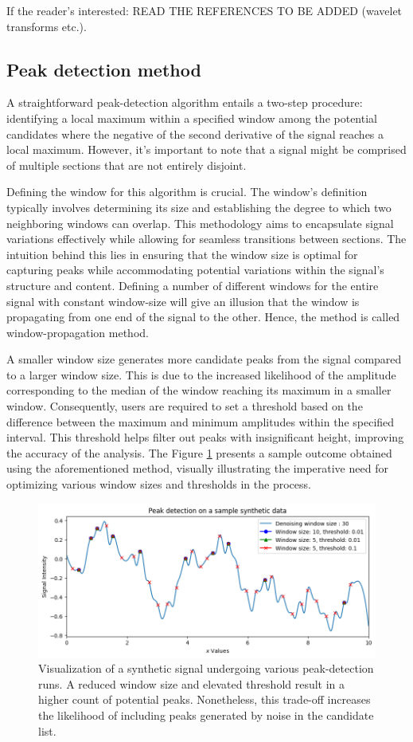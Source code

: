 \documentclass{article}
\begin{document}
If the reader's interested: READ THE REFERENCES TO BE ADDED (wavelet transforms etc.).
%
%
\subsection{Peak detection method}
A straightforward peak-detection algorithm entails a two-step procedure: 
identifying a local maximum within a specified window among the potential candidates where the negative of the second derivative of the signal reaches a local maximum.
However, it's important to note that a signal might be comprised of multiple sections that are not entirely disjoint.

Defining the window for this algorithm is crucial.
The window's definition typically involves determining its size and establishing the degree to which two neighboring windows can overlap. 
This methodology aims to encapsulate signal variations effectively while allowing for seamless transitions between sections.
The intuition behind this lies in ensuring that the window size is optimal for capturing peaks while accommodating potential variations within the signal's structure and content.
Defining a number of different windows for the entire signal with constant window-size will give an illusion that the window is propagating from one end of the signal to the other.
Hence, the method is called window-propagation method. 

A smaller window size generates more candidate peaks from the signal compared to a larger window size.
This is due to the increased likelihood of the amplitude corresponding to the median of the window reaching its maximum in a smaller window. 
Consequently, users are required to set a threshold based on the difference between the maximum and minimum amplitudes within the specified interval.
This threshold helps filter out peaks with insignificant height, improving the accuracy of the analysis.
The Figure \ref{fig:peak_detection} presents a sample outcome obtained using the aforementioned method, visually illustrating the imperative need for optimizing various window sizes and thresholds in the process.
\begin{figure}[hbt!]
    \includegraphics[width=\linewidth]{peak_detection.png}
    \caption{Visualization of a synthetic signal undergoing various peak-detection runs. A reduced window size and elevated threshold result in a higher count of potential peaks. Nonetheless, this trade-off increases the likelihood of including peaks generated by noise in the candidate list.}
    \label{fig:peak_detection}
\end{figure}
\end{document}
